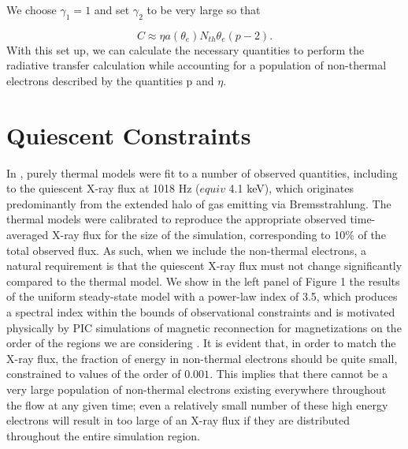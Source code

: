 We choose $\gamma_1=1$ and set $\gamma_2$ to be very large so that

\begin{equation}
	C \approx \eta a(\theta_e) N_{th}\theta_e (p-2).
\end{equation}
With this set up, we can calculate the necessary quantities to perform the radiative transfer calculation while accounting for a population of non-thermal electrons described by the quantities p and $\eta$. 

\section{Quiescent Constraints}

In \citet{chan2015a}, purely thermal models were fit
to a number of observed quantities, including to the quiescent X-ray flux at 1018 Hz ($equiv$ 4.1 keV), which originates
predominantly from the extended halo of gas emitting via
Bremsstrahlung. The thermal models were calibrated to
reproduce the appropriate observed time-averaged X-ray
flux for the size of the simulation, corresponding to 10\%
of the total observed flux. As such, when we include the
non-thermal electrons, a natural requirement is that the
quiescent X-ray flux must not change significantly compared to the thermal model.
We show in the left panel of Figure 1 the results of the
uniform steady-state model with a power-law index of
3.5, which produces a spectral index within the bounds
of observational constraints \citep{barriere2014, porquet2008} and is motivated physically by PIC
simulations of magnetic reconnection for magnetizations
on the order of the regions we are considering \citep{sironi2014}. It is evident that, in order to match
the X-ray flux, the fraction of energy in non-thermal electrons should be quite small, constrained to values of the
order of $0.001$. This implies that there cannot be a very
large population of non-thermal electrons existing everywhere throughout the flow at any given time; even a relatively small number of these high energy electrons will
result in too large of an X-ray flux if they are distributed
throughout the entire simulation region.

